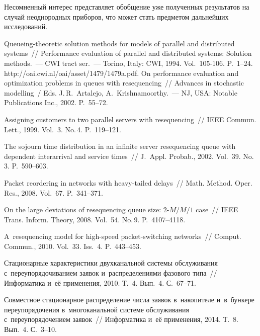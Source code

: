 \begin{multicols}{2}
Несомненный интерес представляет обобщение уже полученных результатов
на случай неоднородных приборов, что может стать предметом дальнейших исследований.

{\small\frenchspacing
 {%
 \begin{thebibliography}{99}

Queueing-theoretic solution methods for models of parallel and distributed systems~// 
Performance evaluation of parallel and distributed systems: Solution methods.~--- 
CWI tract ser.~---  Torino, Italy: CWI, 1994.
Vol.~105-106. P.~1--24. {\sf http://oai.cwi.nl/oai/asset/1479/1479a.pdf}.
On performance evaluation and optimization problems in queues with resequencing~//
Advances in stochastic modelling~/
Eds. J.\,R.~Artalejo, A.~Krishnamoorthy.~---
NJ, USA: Notable Publications Inc.,  2002. P.~55--72.


Assigning customers to two parallel servers with resequencing~//
IEEE Commun. Lett., 1999. Vol.~3. No.\,4. P.~119--121.

The sojourn time distribution in an infinite server resequencing queue with dependent interarrival and service times~//
J.~Appl. Probab., 2002. Vol.~39. No.\,3. P.~590--603.


Packet reordering in networks with heavy-tailed delays~//
Math. Method. Oper. Res., 2008. Vol.~67. P.~341--371.

On the large deviations of resequencing
queue size: 2-$M/M/1$ case~// IEEE Trans. Inform. Theory, 2008.
Vol.~54. No.\,9. P.~4107--4118.

A~resequencing model for high-speed packet-switching networks~//
Comput. Commun., 2010. Vol.~33. Iss.~4. P.~443--453.

Стационарные характеристики двухканальной системы обслуживания 
с~переупорядочиванием заявок и~распределениями фазового типа~// 
Информатика и~её применения, 2010. Т.~4. Вып.~4. С.~67--71.


Совместное стационарное распределение числа заявок в~накопителе 
и~в~бункере переупорядочения в~многоканальной сис\-те\-ме обслуживания 
с~переупорядочением заявок~// Информатика и~её применения, 2014. Т.~8. Вып.~4. С.~3--10.


\end{thebibliography}}}
\end{multicols}
